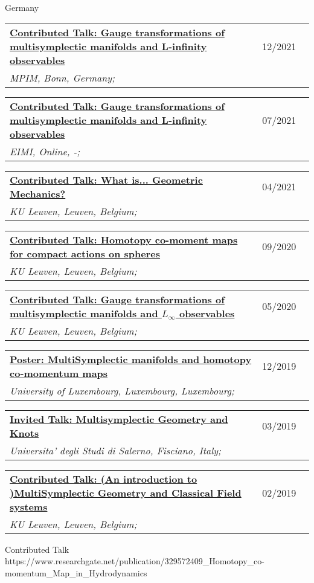 \documentclass[a4paper]{article}
\newcommand{\longvoice}[8]{
    \begin{tabular}{p{0.83\linewidth} p{0.17\linewidth} }
        \textbf{\href{#3}{#2: #1}} & #4 
        \\ 
        \textit{#5, #6, #7;} & {\small\emph{#8}}
    \end{tabular}
    \vspace{.5em}
}
\begin{document}
        {Germany}
        {}
    \longvoice{Gauge transformations of multisymplectic manifolds and L-infinity observables}
        {Contributed Talk}
        {https://www.dropbox.com/s/x267gvrge9xghq1/2112-Bonn-HigherSeminar.pdf?dl=0}
        {12/2021}
        {MPIM}
        {Bonn}
        {Germany}
        {}
    \longvoice{Gauge transformations of multisymplectic manifolds and L-infinity observables}
        {Contributed Talk}
        {https://www.researchgate.net/publication/353463068_Gauge_transformations_of_multisymplectic_manifolds_and_L_observables}
        {07/2021}
        {EIMI}
        {Online}
        {-}
        {}
    \longvoice{What is... Geometric Mechanics?}
        {Contributed Talk}
        {https://wis.kuleuven.be/agenda/PhdColloquia/ay20-21/copy4_of_PhD-coll-Molag}
        {04/2021}
        {KU Leuven}
        {Leuven}
        {Belgium}
        {}
    \longvoice{Homotopy co-moment maps for compact actions on spheres}
        {Contributed Talk}
        {https://www.researchgate.net/publication/344220375_Homotopy_co-moment_maps_for_compact_actions_on_spheres}
        {09/2020}
        {KU Leuven}
        {Leuven}
        {Belgium}
        {}
    \longvoice{Gauge transformations of multisymplectic manifolds and $L_\infty$ observables}
        {Contributed Talk}
        {https://www.researchgate.net/publication/344044689_Gauge_transformations_of_multisymplectic_manifolds_and_L_infinity_observables}
        {05/2020}
        {KU Leuven}
        {Leuven}
        {Belgium}
        {}
    \longvoice{MultiSymplectic manifolds and homotopy co-momentum maps}
        {Poster}
        {https://www.researchgate.net/publication/338019063_Multisymplectic_manifolds_and_Homotopy_co-momentum_maps}
        {12/2019}
        {University of Luxembourg}
        {Luxembourg}
        {Luxembourg}
        {}
    \longvoice{Multisymplectic Geometry and Knots}
        {Invited Talk}
        {https://www.researchgate.net/publication/331939491_Multisymplectic_aspects_of_link_invariants}
        {03/2019}
        {Universita' degli Studi di Salerno}
        {Fisciano}
        {Italy}
        {}
    \longvoice{(An introduction to )MultiSymplectic Geometry and Classical Field systems}
        {Contributed Talk}
        {https://www.dropbox.com/s/q68uv6hbbej8d09/1902-Talk-MultisymplecticFields.pdf?dl=0}
        {02/2019}
        {KU Leuven}
        {Leuven}
        {Belgium}
        {}
        {Contributed Talk}
        {https://www.researchgate.net/publication/329572409_Homotopy_co-momentum_Map_in_Hydrodynamics}
\end{document}
